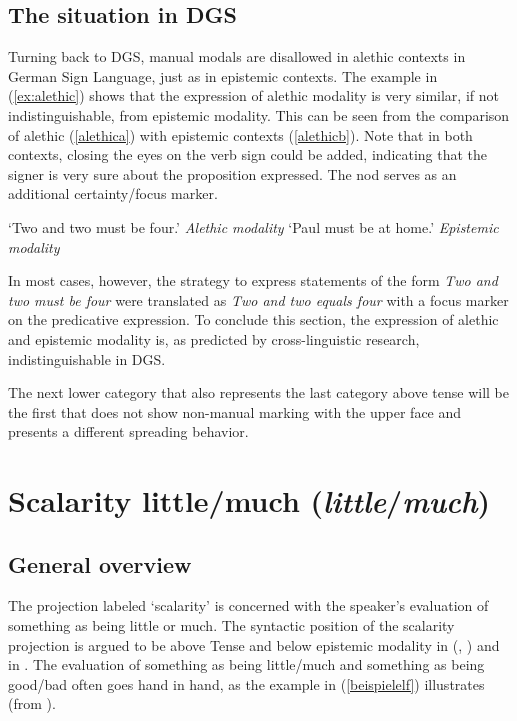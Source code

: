 \subsection{The situation in DGS}
Turning back to DGS, manual modals are disallowed in alethic contexts in German Sign Language, just as in epistemic contexts. The example in (\ref{ex:alethic}) shows that the expression of alethic modality is very similar, if not indistinguishable, from epistemic modality. This can be seen from the comparison of alethic (\ref{alethica}) with epistemic contexts (\ref{alethicb}). Note that in both contexts, closing the eyes on the verb sign could be added, indicating that the signer is very sure about the proposition expressed. The nod serves as an additional certainty/focus marker.




\begin{exe}
\ex\label{ex:alethic}\begin{xlist}
\ex {}
\glt `Two and two must be four.' \label{alethica}\hfill{\textit{Alethic modality}}
\ex  {}
\glt `Paul must be at home.' \label{alethicb}\hfill{\textit{Epistemic modality}}
\end{xlist}
\end{exe}





\noindent In most cases, however, the strategy to express statements of the form \textit{Two and two must be four} were translated as \textit{Two and two equals four} with a focus marker on the predicative expression. To conclude this section, the expression of alethic and epistemic modality is, as predicted by cross-linguistic research, indistinguishable in DGS. 



The next lower category that also represents the last category above tense will be the first that does not show non-manual marking with the upper face and presents a different spreading behavior.

\section{Scalarity little/much (\textit{little}/\textit{much})}\label{scalarity}

\subsection{General overview}
The projection labeled `scalarity' is concerned with the speaker's evaluation of something as being little or much. The syntactic position of the scalarity projection is argued to be above Tense and below epistemic modality in \citeauthor{hole2015distributed} (\citeyear{hole2015distributed}, \citeyear{hole2017crosslinguistic}) and in \citet{bross2017scope}. The evaluation of something as being little/much and something as being good/bad often goes hand in hand, as the example in (\ref{beispielelf}) illustrates (from \citealt[51]{hole2015distributed}).

